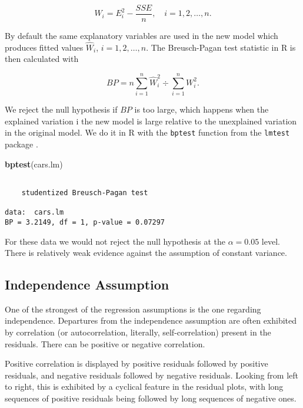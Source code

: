 \documentclass[]{book}
\newenvironment{Shaded}{\begin{snugshade}}{\end{snugshade}}
\newcommand{\KeywordTok}[1]{\textcolor[rgb]{0.13,0.29,0.53}{\textbf{{#1}}}}
\newcommand{\NormalTok}[1]{{#1}}
\numberwithin{equation}{chapter}
\numberwithin{figure}{chapter}
\theoremstyle{plain}
\theoremstyle{definition}
\theoremstyle{remark}
\theoremstyle{definition}
\theoremstyle{definition}
\theoremstyle{remark}
\begin{document}
\begin{equation}
W_{i} = E_{i}^{2} - \frac{SSE}{n}, \quad i=1,2,\ldots,n.
\end{equation}

By default the same explanatory variables are used in the new model
which produces fitted values \(\hat{W}_{i}\), \(i=1,2,\ldots,n\). The
Breusch-Pagan test statistic in R is then calculated with

\begin{equation}
BP=n\sum_{i=1}^{n}\hat{W}_{i}^{2}\div\sum_{i=1}^{n}W_{i}^{2}.
\end{equation}

We reject the null hypothesis if \(BP\) is too large, which happens when
the explained variation i the new model is large relative to the
unexplained variation in the original model. We do it in R with the
\texttt{bptest} function from the \texttt{lmtest} package
\autocite{lmtest}.

\begin{Shaded}
\begin{Highlighting}[]
\KeywordTok{bptest}\NormalTok{(cars.lm)}
\end{Highlighting}
\end{Shaded}

\begin{verbatim}

    studentized Breusch-Pagan test

data:  cars.lm
BP = 3.2149, df = 1, p-value = 0.07297
\end{verbatim}

For these data we would not reject the null hypothesis at the
\(\alpha=0.05\) level. There is relatively weak evidence against the
assumption of constant variance.

\subsection{Independence Assumption}\label{sub-independence-assumption}

One of the strongest of the regression assumptions is the one regarding
independence. Departures from the independence assumption are often
exhibited by correlation (or autocorrelation, literally,
self-correlation) present in the residuals. There can be positive or
negative correlation.

Positive correlation is displayed by positive residuals followed by
positive residuals, and negative residuals followed by negative
residuals. Looking from left to right, this is exhibited by a cyclical
feature in the residual plots, with long sequences of positive residuals
being followed by long sequences of negative ones.
\end{document}
